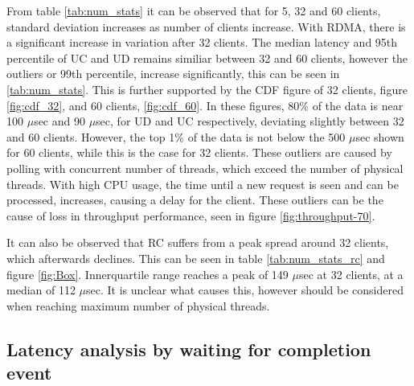 From table \ref{tab:num_stats} it can be observed that for 5, 32 and 60 clients, standard deviation increases as number of clients increase.
With RDMA, there is a significant increase in variation after 32 clients.
The median latency and 95th percentile of UC and UD remains similiar between 32 and 60 clients, however the outliers or 99th percentile, increase significantly, this can be seen in \ref{tab:num_stats}.
This is further supported by the CDF figure of 32 clients, figure \ref{fig:cdf_32}, and 60 clients, \ref{fig:cdf_60}.
In these figures, 80\% of the data is near 100 $\mu$sec and 90 $\mu$sec, for UD and UC respectively, deviating slightly between 32 and 60 clients.
However, the top 1\% of the data is not below the 500 $\mu$sec shown for 60 clients, while this is the case for 32 clients.
These outliers are caused by polling with concurrent number of threads, which exceed the number of physical threads.
With high CPU usage, the time until a new request is seen and can be processed, increases, causing a delay for the client.
These outliers can be the cause of loss in throughput performance, seen in figure \ref{fig:throughput-70}.

It can also be observed that RC suffers from a peak spread around 32 clients, which afterwards declines.
This can be seen in table \ref{tab:num_stats_rc} and figure \ref{fig:Box}.
Innerquartile range reaches a peak of 149 $\mu$sec at 32 clients, at a median of 112 $\mu$sec.
It is unclear what causes this, however should be considered when reaching maximum number of physical threads.

\subsection{Latency analysis by waiting for completion event}


